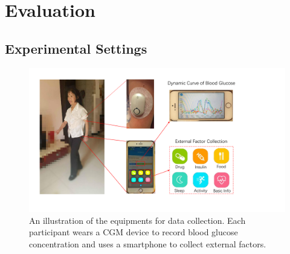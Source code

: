 \section{Evaluation}
\label{sec:eval}

\subsection{Experimental Settings}
\begin{figure}[h]
  \centering
  \includegraphics[width=0.7\columnwidth]{./img/UI.pdf}
  \caption{An illustration of the equipments for data collection. Each participant wears a CGM device to record blood glucose concentration and uses a smartphone to collect external factors. }
  \label{fig:experiment_case}
\end{figure}

